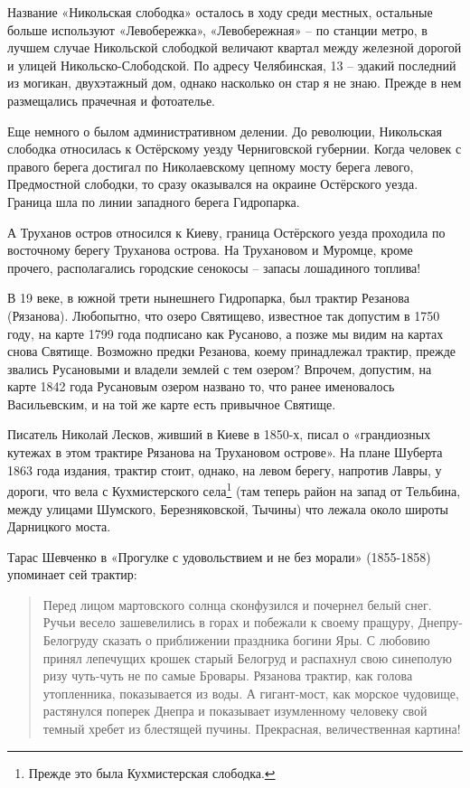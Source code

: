 Название «Никольская слободка» осталось в ходу среди местных, остальные больше используют «Левобережка», «Левобережная» – по станции метро, в лучшем случае Никольской слободкой величают квартал между железной дорогой и улицей Никольско-Слободской. По адресу Челябинская, 13 – эдакий последний из могикан, двухэтажный дом, однако насколько он стар я не знаю. Прежде в нем размещались прачечная и фотоателье.

Еще немного о былом административном делении. До революции, Никольская слободка относилась к Остёрскому уезду Черниговской губернии. Когда человек с правого берега достигал по Николаевскому цепному мосту берега левого, Предмостной слободки, то сразу оказывался на окраине Остёрского уезда. Граница шла по линии западного берега Гидропарка.

А Труханов остров относился к Киеву, граница Остёрского уезда проходила по восточному берегу Труханова острова. На Трухановом и Муромце, кроме прочего, располагались городские сенокосы – запасы лошадиного топлива!

В 19 веке, в южной трети нынешнего Гидропарка, был трактир Резанова (Рязанова). Любопытно, что озеро Святищево, известное так допустим в 1750 году, на карте 1799 года подписано как Русаново, а позже мы видим на картах снова Святище. Возможно предки Резанова, коему принадлежал трактир, прежде звались Русановыми и владели землей с тем озером? Впрочем, допустим, на карте 1842 года Русановым озером названо то, что ранее именовалось Васильевским, и на той же карте есть привычное Святище.

Писатель Николай Лесков, живший в Киеве в 1850-х, писал о «грандиозных кутежах в этом трактире Рязанова на Трухановом острове». На плане Шуберта 1863 года издания, трактир стоит, однако, на левом берегу, напротив Лавры, у дороги, что вела с Кухмистерского села\footnote{Прежде это была Кухмистерская слободка.} (там теперь район на запад от Тельбина, между улицами Шумского, Березняковской, Тычины) что лежала около широты Дарницкого моста.

Тарас Шевченко в «Прогулке с удовольствием и не без морали» (1855-1858) упоминает сей трактир:

\begin{quotation}
Перед лицом мартовского солнца сконфузился и почернел белый снег. Ручьи весело зашевелились в горах и побежали к своему пращуру, Днепру-Бело\-груду сказать о приближении праздника богини Яры. С любовию принял лепечущих крошек старый Белогруд и распахнул свою синеполую ризу чуть-чуть не по самые Бровары. Рязанова трактир, как голова утопленника, показывается из воды. А гигант-мост, как морское чудовище, растянулся поперек Днепра и показывает изумленному человеку свой темный хребет из блестящей пучины. Прекрасная, величественная картина!
\end{quotation}

